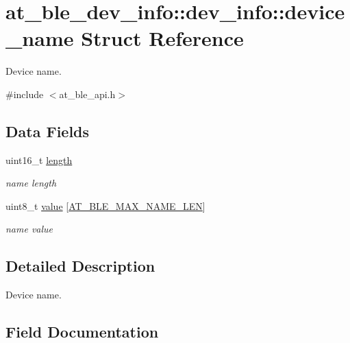 \hypertarget{structat__ble__dev__info_1_1dev__info_1_1device__name}{}\section{at\+\_\+ble\+\_\+dev\+\_\+info\+::dev\+\_\+info\+::device\+\_\+name Struct Reference}
\label{structat__ble__dev__info_1_1dev__info_1_1device__name}


Device name.  




{\ttfamily \#include $<$at\+\_\+ble\+\_\+api.\+h$>$}

\subsection*{Data Fields}
\begin{DoxyCompactItemize}
\item 
uint16\+\_\+t \mbox{\hyperlink{structat__ble__dev__info_1_1dev__info_1_1device__name_a1892eba2086d12ac2b09005aeb09ea3b}{length}}
\begin{DoxyCompactList}\small\item\em name length \end{DoxyCompactList}\item 
uint8\+\_\+t \mbox{\hyperlink{structat__ble__dev__info_1_1dev__info_1_1device__name_a475c040a11281f79de92f073c7521dc5}{value}} \mbox{[}\mbox{\hyperlink{at__ble__api_8h_ade8ce3f882f05dd2b9e5da4c2d6142ba}{A\+T\+\_\+\+B\+L\+E\+\_\+\+M\+A\+X\+\_\+\+N\+A\+M\+E\+\_\+\+L\+EN}}\mbox{]}
\begin{DoxyCompactList}\small\item\em name value \end{DoxyCompactList}\end{DoxyCompactItemize}


\subsection{Detailed Description}
Device name. 

\subsection{Field Documentation}
\mbox{\label{structat__ble__dev__info_1_1dev__info_1_1device__name_a1892eba2086d12ac2b09005aeb09ea3b}} 
